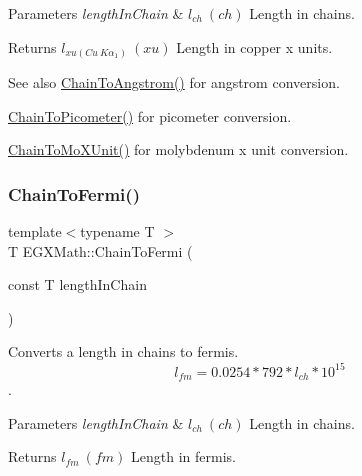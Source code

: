 \begin{DoxyParams}{Parameters}
{\em length\+In\+Chain} & $ l_{ch}\ (ch)$ Length in chains. \\
\hline
\end{DoxyParams}
\begin{DoxyReturn}{Returns}
$ l_{xu(Cu\ K\alpha_1)}\ (xu)$ Length in copper x units. 
\end{DoxyReturn}
\begin{DoxySeeAlso}{See also}
\mbox{\hyperlink{group___e_g_x_math-_conversions-_length_conversions-_imperial-_chain-_non-_s_i_ga89e870762310908510aad80d26dc1942}{Chain\+To\+Angstrom()}} for angstrom conversion. 

\mbox{\hyperlink{group___e_g_x_math-_conversions-_length_conversions-_imperial-_chain-_s_i_ga27f06f3f63727a16e02afaf8f01f4b45}{Chain\+To\+Picometer()}} for picometer conversion. 

\mbox{\hyperlink{group___e_g_x_math-_conversions-_length_conversions-_imperial-_chain-_non-_s_i_gae4a2b99d846db53416e9fc5d6f9e957c}{Chain\+To\+Mo\+X\+Unit()}} for molybdenum x unit conversion. 
\end{DoxySeeAlso}
\mbox{\label{group___e_g_x_math-_conversions-_length_conversions-_imperial-_chain-_non-_s_i_ga88b0e20b062ca36346a6daeb5052c40a}} 
\subsubsection{\texorpdfstring{Chain\+To\+Fermi()}{ChainToFermi()}}
{\footnotesize\ttfamily template$<$typename T $>$ \\
T E\+G\+X\+Math\+::\+Chain\+To\+Fermi (\begin{DoxyParamCaption}\item[{const T}]{length\+In\+Chain }\end{DoxyParamCaption})}



Converts a length in chains to fermis. \[ l_{fm}=0.0254 * 792 * l_{ch} * 10^{15} \]. 


\begin{DoxyParams}{Parameters}
{\em length\+In\+Chain} & $ l_{ch}\ (ch)$ Length in chains. \\
\hline
\end{DoxyParams}
\begin{DoxyReturn}{Returns}
$ l_{fm}\ (fm)$ Length in fermis. 
\end{DoxyReturn}
\mbox{\label{group___e_g_x_math-_conversions-_length_conversions-_imperial-_chain-_non-_s_i_ga9efe9ceb0ab30639026cbb4158bb0148}} 
